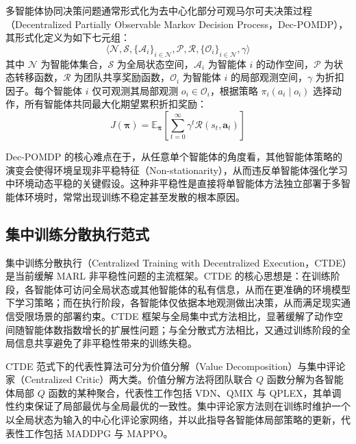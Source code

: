 多智能体协同决策问题通常形式化为去中心化部分可观马尔可夫决策过程（Decentralized Partially Observable Markov Decision Process，Dec-POMDP），其形式化定义为如下七元组：
\begin{equation}
  \langle \mathcal{N}, \mathcal{S}, \{\mathcal{A}_i\}_{i \in \mathcal{N}}, \mathcal{P},
  \mathcal{R}, \{\mathcal{O}_i\}_{i \in \mathcal{N}}, \gamma \rangle
  \label{eq:ch2_dec_pomdp}
\end{equation}
其中 $\mathcal{N}$ 为智能体集合，$\mathcal{S}$ 为全局状态空间，$\mathcal{A}_i$ 为智能体 $i$ 的动作空间，$\mathcal{P}$ 为状态转移函数，$\mathcal{R}$ 为团队共享奖励函数，$\mathcal{O}_i$ 为智能体 $i$ 的局部观测空间，$\gamma$ 为折扣因子。每个智能体 $i$ 仅可观测其局部观测 $o_i \in \mathcal{O}_i$，根据策略 $\pi_i(a_i \mid o_i)$ 选择动作，所有智能体共同最大化期望累积折扣奖励：
\begin{equation}
  J(\boldsymbol{\pi}) = \mathbb{E}_{\boldsymbol{\pi}}
  \!\left[\sum_{t=0}^{\infty} \gamma^t \mathcal{R}(s_t, \mathbf{a}_t)\right]
  \label{eq:ch2_marl_objective}
\end{equation}

Dec-POMDP 的核心难点在于，从任意单个智能体的角度看，其他智能体策略的演变会使得环境呈现非平稳特征（Non-stationarity），从而违反单智能体强化学习中环境动态平稳的关键假设\cite{Tsitsiklis1997,Liu2025MARL}。这种非平稳性是直接将单智能体方法独立部署于多智能体环境时，常常出现训练不稳定甚至发散的根本原因。

\subsection{集中训练分散执行范式}
\label{subsec:ch2_ctde}

集中训练分散执行（Centralized Training with Decentralized Execution，CTDE）是当前缓解 MARL 非平稳性问题的主流框架\cite{Amato2024CTDE}。CTDE 的核心思想是：在训练阶段，各智能体可访问全局状态或其他智能体的私有信息，从而在更准确的环境模型下学习策略；而在执行阶段，各智能体仅依据本地观测做出决策，从而满足现实通信受限场景的部署约束。CTDE 框架与全局集中式方法相比，显著缓解了动作空间随智能体数指数增长的扩展性问题；与全分散式方法相比，又通过训练阶段的全局信息共享避免了非平稳性带来的训练失稳。

CTDE 范式下的代表性算法可分为价值分解（Value Decomposition）与集中评论家（Centralized Critic）两大类。价值分解方法将团队联合 $Q$ 函数分解为各智能体局部 $Q$ 函数的某种聚合，代表性工作包括 VDN、QMIX 与 QPLEX，其单调性约束保证了局部最优与全局最优的一致性\cite{Sunehag2018VDN,Rashid2018QMIX,Amato2024CTDE}。集中评论家方法则在训练时维护一个以全局状态为输入的中心化评论家网络，并以此指导各智能体局部策略的更新，代表性工作包括 MADDPG 与 MAPPO\cite{Lowe2017,ref5,Liu2025MARL}。


